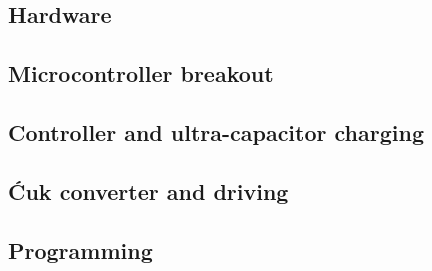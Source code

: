 \subsection{Hardware}
\subsection{Microcontroller breakout}

\subsection{Controller and ultra-capacitor charging}

\subsection{\'Cuk converter and driving}

\subsection{Programming}

